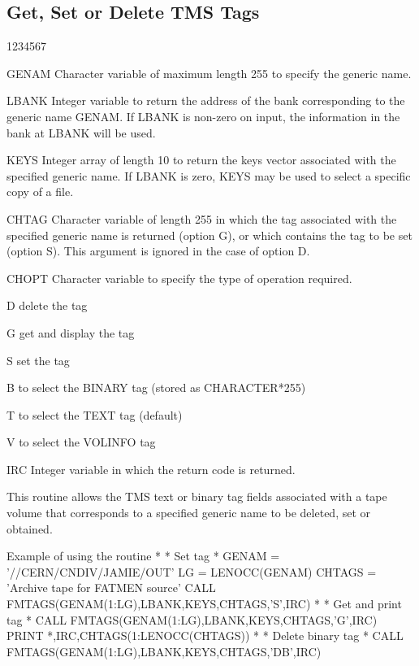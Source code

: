 \subsection{Get, Set or Delete TMS Tags}
\begin{DLtt}{1234567}
\item[GENAM]
Character variable of maximum length 255 to specify the generic name.
\item[LBANK]
Integer variable to return the address of the bank corresponding
to the generic name GENAM.
If LBANK is non-zero on input, the information in the 
bank at LBANK will be used.
\item[KEYS]
Integer array of length 10 to return the keys vector associated
with the specified generic name.
If LBANK is zero, KEYS may be used to select a specific
copy of a file.
\item[CHTAG]
Character variable of length 255 in which the tag associated with
the specified generic name is returned (option G), or which
contains the tag to be set (option S). This argument is ignored
in the case of option D.
\item[CHOPT]
Character variable to specify the type of operation required.
\begin{DLtt}{12}
\item[D]delete the tag
\item[G]get and display the tag
\item[S]set the tag
\item[B]to select the BINARY  tag (stored as CHARACTER*255)
\item[T]to select the TEXT    tag (default)
\item[V]to select the VOLINFO tag 
\end{DLtt}
\item[IRC]
Integer variable in which the return code is returned.
\end{DLtt}
\par
This routine allows the TMS text or binary tag fields associated
with a tape volume that corresponds to a specified generic name
to be deleted, set or obtained. 
\begin{XMPt}{Example of using the \protect{} routine}
*
*     Set tag
*
      GENAM = '//CERN/CNDIV/JAMIE/OUT'
      LG    = LENOCC(GENAM)
      CHTAGS = 'Archive tape for FATMEN source'
      CALL FMTAGS(GENAM(1:LG),LBANK,KEYS,CHTAGS,'S',IRC)
*
*     Get and print tag
*
      CALL FMTAGS(GENAM(1:LG),LBANK,KEYS,CHTAGS,'G',IRC)
      PRINT *,IRC,CHTAGS(1:LENOCC(CHTAGS))
*
*     Delete binary tag
*
      CALL FMTAGS(GENAM(1:LG),LBANK,KEYS,CHTAGS,'DB',IRC)
\end{XMPt}
